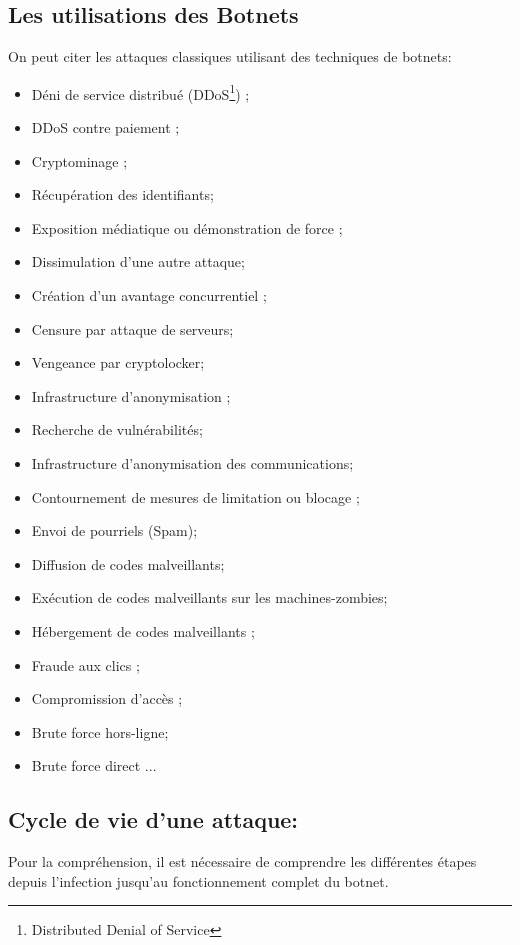 
\subsection{Les utilisations des Botnets}
On peut citer les attaques classiques utilisant des techniques de botnets:
\begin{itemize}
	\item Déni de service distribué (DDoS\footnote{Distributed Denial of Service}) ;
	\item DDoS contre paiement ;
	\item Cryptominage ;
	\item Récupération des identifiants;
	\item Exposition médiatique ou démonstration de force ;
	\item Dissimulation d’une autre attaque;
	\item Création d’un avantage concurrentiel ;
	\item Censure par attaque de serveurs;
	\item Vengeance par cryptolocker;
	\item Infrastructure d’anonymisation ;
	\item Recherche de vulnérabilités;
	\item Infrastructure d’anonymisation des communications;
	\item Contournement de mesures de limitation ou blocage ;
	\item Envoi de pourriels (Spam);
	\item Diffusion de codes malveillants;
	\item Exécution de codes malveillants sur les machines-zombies;
	\item Hébergement de codes malveillants ;
	\item Fraude aux clics ;
	\item Compromission d’accès ;
	\item Brute force hors-ligne;
	\item Brute force direct ...

\end{itemize}


\subsection{Cycle de vie d'une attaque:}
\par Pour la compréhension, il est nécessaire de comprendre les différentes étapes depuis l'infection jusqu'au fonctionnement complet du botnet.

